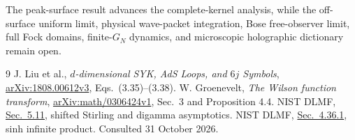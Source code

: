 \documentclass[11pt,a4paper]{article}
\begin{document}
The peak-surface result advances the complete-kernel analysis, while
the off-surface uniform limit, physical wave-packet integration,
Bose free-observer limit, full Fock domains, finite-$G_N$ dynamics,
and microscopic holographic dictionary remain open.

\begin{thebibliography}{9}
 J. Liu et al., \emph{$d$-dimensional SYK, AdS Loops, and
$6j$ Symbols}, \href{https://arxiv.org/html/1808.00612v3}
{arXiv:1808.00612v3}, Eqs.\ (3.35)--(3.38).
 W. Groenevelt, \emph{The Wilson function transform},
\href{https://arxiv.org/html/math/0306424v1}{arXiv:math/0306424v1},
Sec.\ 3 and Proposition 4.4.
 NIST DLMF,
\href{https://dlmf.nist.gov/5.11}{Sec.\ 5.11}, shifted Stirling and
digamma asymptotics.
 NIST DLMF,
\href{https://dlmf.nist.gov/4.36}{Sec.\ 4.36.1}, sinh infinite product.
Consulted 31 October 2026.
\end{thebibliography}
\end{document}
